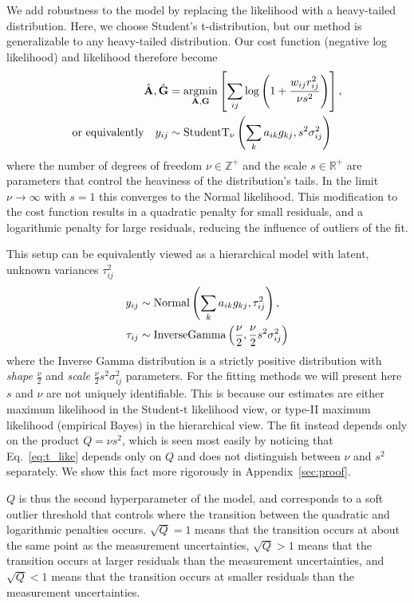 \documentclass[onecolumn,floatfix]{aastex631}
\DeclareMathOperator*{\argmin}{argmin}
\begin{document}
We add robustness to the model by replacing the likelihood with a heavy-tailed distribution.
Here, we choose Student's t-distribution, but our method is generalizable to any heavy-tailed distribution.
Our cost function (negative log likelihood) and likelihood therefore become %
\begin{align}
    \hat{\bf A}, \hat{\bf G} &= \argmin_{\bf A, G} \left[ \sum_{ij} \log\left(1 + \frac{w_{ij} r_{ij}^2}{\nu s^2}\right) \right], \label{eq:robust_opt} \\
    {\rm or \,\, equivalently} \quad y_{ij} &\sim {\rm StudentT}_\nu \left( \sum_k a_{ik} g_{kj}, s^2 \sigma_{ij}^2 \right) \label{eq:t_like}
\end{align}
where the number of degrees of freedom $\nu\in\mathbb{Z}^+$ and the scale $s\in\mathbb{R}^+$ are parameters that control the heaviness of the distribution's tails.
In the limit $\nu \rightarrow \infty$ with $s=1$ this converges to the Normal likelihood.
This modification to the cost function results in a quadratic penalty for small residuals, and a logarithmic penalty for large residuals, reducing the influence of outliers of the fit.

This setup can be equivalently viewed as a hierarchical model with latent, unknown variances $\tau_{ij}^2$
\begin{align}
    y_{ij} &\sim {\rm Normal} \left( \sum_k a_{ik} g_{kj}, \tau_{ij}^2 \right), \label{eq:hierachical_like} \\
    \tau_{ij} &\sim {\rm InverseGamma} \left( \frac{\nu}{2}, \frac{\nu}{2} s^2 \sigma_{ij}^2 \right) \label{eq:hierarchical_prior}
\end{align}
where the Inverse Gamma distribution is a strictly positive distribution with \emph{shape} $\frac{\nu}{2}$ and \emph{scale} $\frac{\nu}{2} s^2 \sigma_{ij}^2$ parameters.
For the fitting methods we will present here $s$ and $\nu$ are not uniquely identifiable.
This is because our estimates are either maximum likelihood in the Student-t likelihood view, or type-II maximum likelihood (empirical Bayes) in the hierarchical view.
The fit instead depends only on the product $Q=\nu s^2$, which is seen most easily by noticing that Eq.~\eqref{eq:t_like} depends only on $Q$ and does not distinguish between $\nu$ and $s^2$ separately.
We show this fact more rigorously in Appendix~\ref{sec:proof}.

$Q$ is thus the second hyperparameter of the model, and corresponds to a soft outlier threshold that controls where the transition between the quadratic and logarithmic penalties occurs.
$\sqrt{Q}=1$ means that the transition occurs at about the same point as the measurement uncertainties, $\sqrt{Q}>1$ means that the transition occurs at larger residuals than the measurement uncertainties, and $\sqrt{Q}<1$ means that the transition occurs at smaller residuals than the measurement uncertainties.
\end{document}
